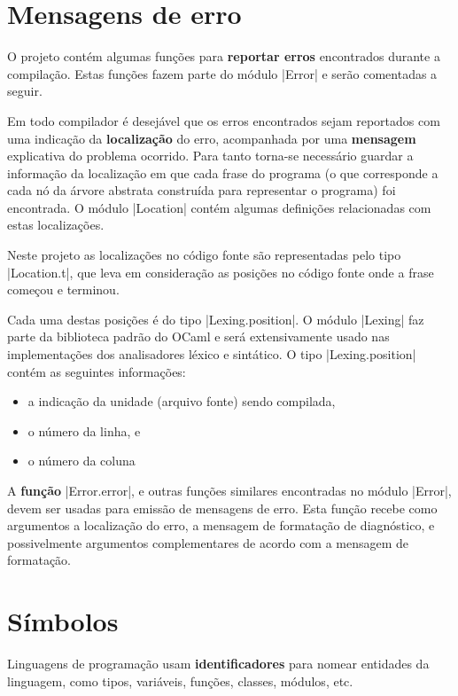 \documentclass[a4paper,11pt,brazil]{article}
\begin{document}
\section{Mensagens de erro}

O projeto contém algumas funções para \textbf{reportar erros}
encontrados durante a compilação. Estas funções fazem parte do módulo
\pyginline|Error| e serão comentadas a seguir.

Em todo compilador é desejável que os erros encontrados sejam
reportados com uma indicação da \textbf{localização} do erro,
acompanhada por uma \textbf{mensagem} explicativa do problema
ocorrido. Para tanto torna-se necessário guardar a informação da
localização em que cada frase do programa (o que corresponde a cada nó
da árvore abstrata construída para representar o programa) foi
encontrada. O módulo \pyginline|Location| contém algumas definições
relacionadas com estas localizações.

Neste projeto as localizações no código fonte são representadas pelo
tipo \pyginline|Location.t|, que leva em consideração as posições no
código fonte onde a frase começou e terminou.

Cada uma destas posições é do tipo \pyginline|Lexing.position|. O
módulo \pyginline|Lexing| faz parte da biblioteca padrão do OCaml e
será extensivamente usado nas implementações dos analisadores léxico e
sintático. O tipo \pyginline|Lexing.position| contém as seguintes
informações:
\begin{itemize}[noitemsep]
  \item a indicação da unidade (arquivo fonte) sendo compilada,
  \item o número da linha, e
  \item o número da coluna
\end{itemize}

A \textbf{função} \pyginline|Error.error|, e outras funções similares
encontradas no módulo \pyginline|Error|, devem ser usadas para emissão
de mensagens de erro. Esta função recebe como argumentos a localização
do erro, a mensagem de formatação de diagnóstico, e possivelmente
argumentos complementares de acordo com a mensagem de formatação.


\section{Símbolos}

Linguagens de programação usam \textbf{identificadores} para nomear
entidades da linguagem, como tipos, variáveis, funções, classes,
módulos, etc.
\end{document}
